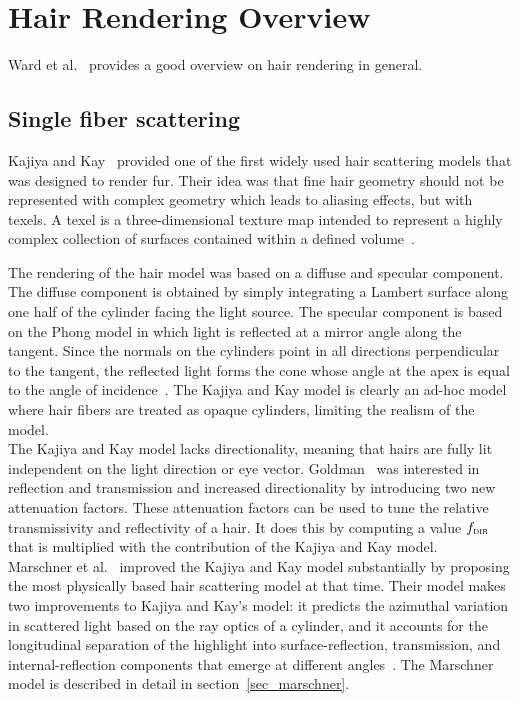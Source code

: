 \documentclass[11pt,a4paper]{report}
\begin{document}
\section{Hair Rendering Overview}

Ward et al.~\cite{ward} provides a good overview on hair rendering in general.

\subsection{Single fiber scattering}

Kajiya and Kay~\cite{kajiya} provided one of the first widely used hair scattering models that was designed to render fur. Their idea was that fine hair geometry should not be represented with complex geometry which leads to aliasing effects, but with texels. A texel is a three-dimensional texture map intended to represent a highly complex collection of surfaces contained within a defined volume~\cite{kajiya}.

The rendering of the hair model was based on a diffuse and specular component. The diffuse component is obtained by simply integrating a Lambert surface along one half of the cylinder facing the light source. The specular component is based on the Phong model in which light is reflected at a mirror angle along the tangent. Since the normals on the cylinders point in all directions perpendicular to the tangent, the reflected light forms the cone whose angle at the apex is equal to the angle of incidence~\cite{kajiya}. The Kajiya and Kay model is clearly an ad-hoc model where hair fibers are treated as opaque cylinders, limiting the realism of the model.\\

The Kajiya and Kay model lacks directionality, meaning that hairs are fully lit independent on the light direction or eye vector. Goldman~\cite{goldman} was interested in reflection and transmission and increased directionality by introducing two new attenuation factors. These attenuation factors can be used to tune the relative transmissivity and reflectivity of a hair. It does this by computing a value $f_{\textsc{dir}}$ that is multiplied with the contribution of the Kajiya and Kay model.\\

Marschner et al.~\cite{marschner} improved the Kajiya and Kay model substantially by proposing the most physically based hair scattering model at that time. Their model makes two improvements to Kajiya and Kay's model: it predicts the azimuthal variation in scattered light based on the ray optics of a cylinder, and it accounts for the longitudinal separation of the highlight into surface-reflection, transmission, and internal-reflection components that emerge at different angles~\cite{hadap}. The Marschner model is described in detail in section~\ref{sec_marschner}.
\end{document}
